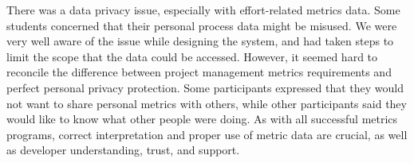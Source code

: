 There was a data privacy issue, especially with effort-related metrics data. Some students concerned that their personal process data might be misused. We were very well aware of the issue while designing the system, and had taken steps to limit the scope that the data could be accessed. However, it seemed hard to reconcile the difference between project management metrics requirements and perfect personal privacy protection. Some participants expressed that they would not want to share personal metrics with others, while other participants said they would like to know what other people were doing. As with all successful metrics programs, correct interpretation and proper use of metric data are crucial, as well as developer understanding, trust, and support.
	











